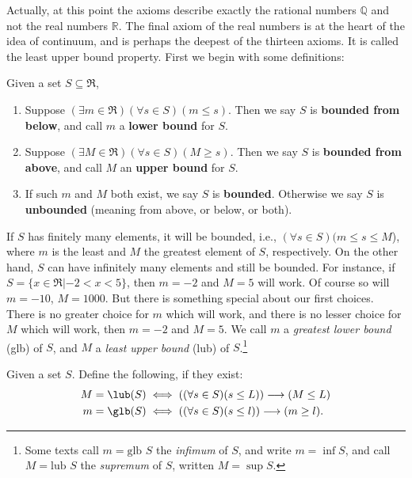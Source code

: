 Actually, at this point the axioms describe exactly the rational 
numbers $\mathbb{Q}$ and not the real numbers $\mathbb{R}$.  
The final axiom of the real numbers is at the
heart of the idea of continuum, and is perhaps the deepest of
the thirteen axioms. It is called the least upper bound property.
First we begin with some definitions:
\begin{definition} Given a set $S\subseteq \Re$,
\begin{enumerate}
\item Suppose $(\exists m\in\Re)(\forall s\in S)(m\le s)$.
Then we say $S$ is {\bf bounded from below},
and call $m$ a {\bf lower bound} for $S$. 
\item Suppose $(\exists M\in\Re)(\forall s\in S)(M\ge s)$.
Then we say $S$ is {\bf bounded from above},
and call $M$ an {\bf upper bound} for $S$. 
\item If such $m$ and $M$ both exist, we say $S$ is {\bf bounded}. 
Otherwise we say $S$ is {\bf unbounded} (meaning from above, or below,
or both).
\end{enumerate}
\label{LUBPropDefinition}\end{definition}  
If $S$ has finitely many elements, it will be bounded,
i.e., $(\forall s\in S)(m\le s\le M$), where  $m$ is
the least and $M$ the greatest element  of $S$, respectively.  
On the other hand, $S$ can have infinitely many 
elements and still be bounded.  For instance,
if $S=\{x\in\Re|-2< x< 5\}$, then $m=-2$ and
$M=5$ will work.    Of course so will $m=-10$, $M=1000$.
But there is something special about our first choices.
There is no greater choice for $m$ which will work, and
there is no lesser choice for $M$ which will work, then
$m=-2$ and $M=5$.  We call $m$ a {\it greatest lower bound}
(glb) of $S$, and $M$ a {\it least upper bound} (lub)
of $S$.\footnote{Some texts call $m=\text{glb }S$ the {\it infimum}
of $S$, and write $m=\inf S$, and call $M=\text{lub }S$ the
{\it supremum} of $S$, written $M=\sup S$.}
\begin{definition}
Given a set $S$.  Define the following, if they exist:
\begin{align*} 
M=\lub(S) &\iff ((\forall s\in S)(s\le L))\longrightarrow(M\le L)\\
m=\glb(S) &\iff ((\forall s\in S)(s\le l))\longrightarrow(m\ge l).
\end{align*}\end{definition} 
